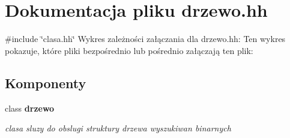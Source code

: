 \section{\-Dokumentacja pliku drzewo.\-hh}
\label{drzewo_8hh}
{\ttfamily \#include \char`\"{}clasa.\-hh\char`\"{}}\*
\-Wykres zależności załączania dla drzewo.\-hh\-:
\-Ten wykres pokazuje, które pliki bezpośrednio lub pośrednio załączają ten plik\-:
\subsection*{\-Komponenty}
\begin{DoxyCompactItemize}
\item 
class {\bf drzewo}
\begin{DoxyCompactList}\small\item\em clasa sluzy do obslugi struktury drzewa wyszukiwan binarnych \end{DoxyCompactList}\end{DoxyCompactItemize}
